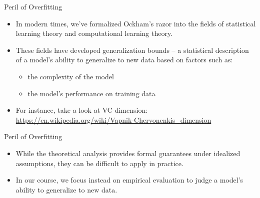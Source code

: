 \documentclass{beamer}
\begin{document}

\begin{frame}{Peril of Overfitting}
\begin{itemize}
\item In modern times, we've formalized Ockham's razor into the fields of statistical learning theory and computational learning theory. 

\medskip    
\item These fields have developed generalization bounds -- a statistical description of a model's ability to generalize to new data based on factors such as:

\medskip
\begin{itemize}
\item the complexity of the model

\medskip
\item the model's performance on training data
\end{itemize}

\medskip
\item For instance, take a look at VC-dimension:
{\footnotesize \url{https://en.wikipedia.org/wiki/Vapnik-Chervonenkis\_dimension}}
\end{itemize}
\end{frame}


\begin{frame}{Peril of Overfitting}
\begin{itemize}
\item While the theoretical analysis provides formal guarantees under idealized assumptions, they can be difficult to apply in practice. 

\medskip
\item In our course, we focus instead on empirical evaluation to judge a model's ability to generalize to new data.
\end{itemize}
\end{frame}

\end{document}

